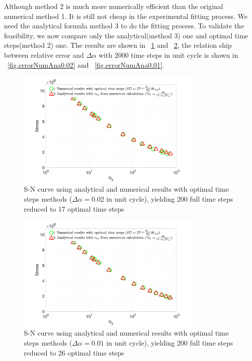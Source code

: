 \documentclass[3p,times,number,review]{elsarticle}
\newcommand{\figref}[1]{\figurename~\ref{#1}}
\begin{document}
Although method 2 is much more numerically efficient than the original numerical method 1. It is still not cheap in the experimental fitting process. We need the analytical formula method 3 to do the fitting process. To validate the feasibility, we now compare only the analytical(method 3) one and optimal time steps(method 2) one. The results are shown in \figref{fig.SNnumerical2methods} and \figref{fig.SNnumerical2methods2}, the relation ship between relative error and $\Delta \alpha$ with 2000 time steps in unit cycle is shown in  \figref{fig.errorNumAna0.02} and \figref{fig.errorNumAna0.01}.
\begin{figure}[!h]
	\centering
	\includegraphics[width=0.8\textwidth]{figures//SN_opt_ana_200_delta_alp=0.02.png} 
	\caption{S-N curve using analytical and numerical results with optimal time steps methods ($\Delta \alpha=0.02$ in unit cycle), yielding 200 full time steps reduced to 17 optimal time steps}
	\label{fig.SNnumerical2methods}
\end{figure}
\begin{figure}[!h]
	\centering
	\includegraphics[width=0.8\textwidth]{figures//SN_opt_ana_200_delta_alp=0.01.png} 
	\caption{S-N curve using analytical and numerical results with optimal time steps methods ($\Delta \alpha=0.01$ in unit cycle), yielding 200 full time steps reduced to 26  optimal time steps}
	\label{fig.SNnumerical2methods2}
\end{figure}
\end{document}
